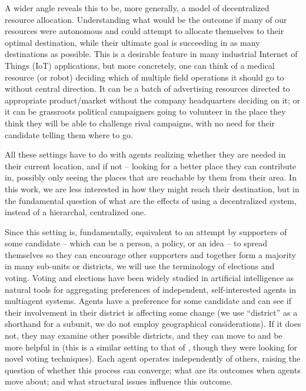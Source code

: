 \documentclass[letterpaper]{article} %
\begin{document}
A wider angle reveals this to be, more generally, a model of decentralized resource allocation.
Understanding what would be the outcome if many of our resources were autonomous and could attempt to allocate themselves to their optimal destination, while their ultimate goal is succeeding in as many destinations as possible.
This is a desirable feature in many industrial Internet of Things (IoT) applications, but more concretely, one can think of a medical resource (or robot) deciding which of multiple field operations it should go to without central direction. It can be a batch of advertising resources directed to appropriate product/market without the company headquarters deciding on it; or it can be grassroots political campaigners going to volunteer in the place they think they will be able to challenge rival campaigns, with no need for their candidate telling them where to go.

All these settings have to do with agents realizing whether they are needed in their current location, and if not -- looking for a better place they can contribute in, possibly only seeing the places that are reachable by them from their area. In this work, we are less interested in how they might reach their destination, but in the fundamental question of what are the effects of using a decentralized system, instead of a hierarchal, centralized one.

Since this setting is, fundamentally, equivalent to an attempt by supporters of some candidate -- which can be a person, a policy, or an idea -- to spread themselves so they can encourage other supporters and together form a majority in many sub-units or districts, we will use the terminology of elections and voting. 
Voting and elections have been widely studied in artificial intelligence as natural tools for aggregating preferences of independent, self-interested agents in multiagent systems. 
Agents have a preference for some candidate and can see if their involvement in their district is affecting some change (we use ``district'' as a shorthand for a subunit, we do not employ geographical considerations). If it does not, they may examine other possible districts, and they can move to and be more helpful in (this is a similar setting to that of \cite{BM12}, though they were looking for novel voting techniques). Each agent operates independently of others, raising the question of whether this process can converge; what are its outcomes when agents move about; and what structural issues influence this outcome.
\end{document}
